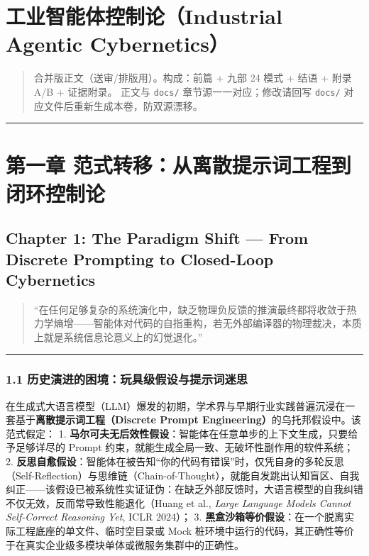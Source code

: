 \section{工业智能体控制论（Industrial Agentic
Cybernetics）}\label{ux5de5ux4e1aux667aux80fdux4f53ux63a7ux5236ux8bbaindustrial-agentic-cybernetics}

\begin{quote}
合并版正文（送审/排版用）。构成：前篇 + 九部 24 模式 + 结语 + 附录 A/B +
证据附录。 正文与 \texttt{docs/} 章节源一一对应；修改请回写
\texttt{docs/} 对应文件后重新生成本卷，防双源漂移。
\end{quote}

\begin{center}\rule{0.5\linewidth}{0.5pt}\end{center}

\section{第一章
范式转移：从离散提示词工程到闭环控制论}\label{ux7b2cux4e00ux7ae0-ux8303ux5f0fux8f6cux79fbux4eceux79bbux6563ux63d0ux793aux8bcdux5de5ux7a0bux5230ux95edux73afux63a7ux5236ux8bba}

\subsection{Chapter 1: The Paradigm Shift --- From Discrete Prompting to
Closed-Loop
Cybernetics}\label{chapter-1-the-paradigm-shift-from-discrete-prompting-to-closed-loop-cybernetics}

\begin{quote}
``在任何足够复杂的系统演化中，缺乏物理负反馈的推演最终都将收敛于热力学熵增------智能体对代码的自指重构，若无外部编译器的物理裁决，本质上就是系统信息论意义上的幻觉退化。''
\end{quote}

\begin{center}\rule{0.5\linewidth}{0.5pt}\end{center}

\subsubsection{1.1
历史演进的困境：玩具级假设与提示词迷思}\label{ux5386ux53f2ux6f14ux8fdbux7684ux56f0ux5883ux73a9ux5177ux7ea7ux5047ux8bbeux4e0eux63d0ux793aux8bcdux8ff7ux601d}

在生成式大语言模型（LLM）爆发的初期，学术界与早期行业实践普遍沉浸在一套基于\textbf{离散提示词工程（Discrete
Prompt Engineering）}的乌托邦假设中。该范式假定： 1.
\textbf{马尔可夫无后效性假设}：智能体在任意单步的上下文生成，只要给予足够详尽的
Prompt 约束，就能生成全局一致、无破坏性副作用的软件系统； 2.
\textbf{反思自愈假设}：智能体在被告知``你的代码有错误''时，仅凭自身的多轮反思（Self-Reflection）与思维链（Chain-of-Thought），就能自发跳出认知盲区、自我纠正------该假设已被系统性实证证伪：在缺乏外部反馈时，大语言模型的自我纠错不仅无效，反而常导致性能退化（Huang
et al., \emph{Large Language Models Cannot Self-Correct Reasoning Yet},
ICLR 2024）； 3.
\textbf{黑盒沙箱等价假设}：在一个脱离实际工程底座的单文件、临时空目录或
Mock
桩环境中运行的代码，其正确性等价于在真实企业级多模块单体或微服务集群中的正确性。

